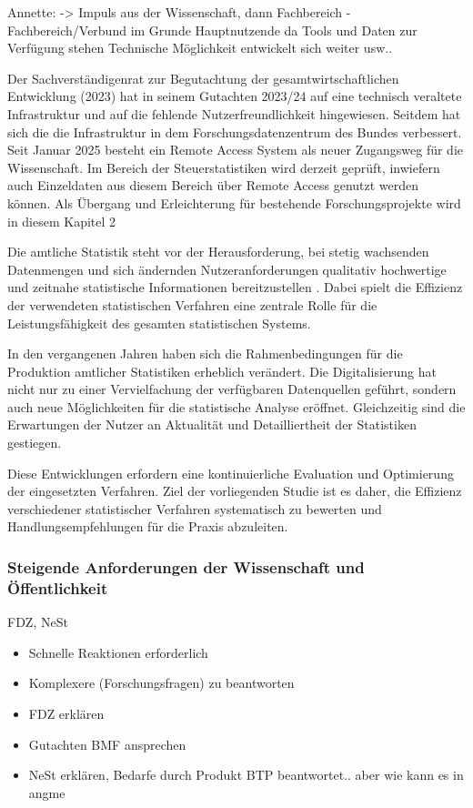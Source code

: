 \documentclass[
  german,
  10pt,
  twoside]{article}
\providecommand{\tightlist}{%
  \setlength{\itemsep}{0pt}\setlength{\parskip}{0pt}}
\begin{document}
Annette: -\textgreater{} Impuls aus der Wissenschaft, dann Fachbereich -
Fachbereich/Verbund im Grunde Hauptnutzende da Tools und Daten zur
Verfügung stehen Technische Möglichkeit entwickelt sich weiter usw..

Der Sachverständigenrat zur Begutachtung der gesamtwirtschaftlichen
Entwicklung (2023) hat in seinem Gutachten 2023/24 auf eine technisch
veraltete Infrastruktur und auf die fehlende Nutzerfreundlichkeit
hingewiesen. Seitdem hat sich die die Infrastruktur in dem
Forschungsdatenzentrum des Bundes verbessert. Seit Januar 2025 besteht
ein Remote Access System als neuer Zugangsweg für die Wissenschaft. Im
Bereich der Steuerstatistiken wird derzeit geprüft, inwiefern auch
Einzeldaten aus diesem Bereich über Remote Access genutzt werden können.
Als Übergang und Erleichterung für bestehende Forschungsprojekte wird in
diesem Kapitel 2

Die amtliche Statistik steht vor der Herausforderung, bei stetig
wachsenden Datenmengen und sich ändernden Nutzeranforderungen qualitativ
hochwertige und zeitnahe statistische Informationen bereitzustellen
\autocite{destatis2023}. Dabei spielt die Effizienz der verwendeten
statistischen Verfahren eine zentrale Rolle für die Leistungsfähigkeit
des gesamten statistischen Systems.

In den vergangenen Jahren haben sich die Rahmenbedingungen für die
Produktion amtlicher Statistiken erheblich verändert. Die
Digitalisierung hat nicht nur zu einer Vervielfachung der verfügbaren
Datenquellen geführt, sondern auch neue Möglichkeiten für die
statistische Analyse eröffnet. Gleichzeitig sind die Erwartungen der
Nutzer an Aktualität und Detailliertheit der Statistiken gestiegen.

Diese Entwicklungen erfordern eine kontinuierliche Evaluation und
Optimierung der eingesetzten Verfahren. Ziel der vorliegenden Studie ist
es daher, die Effizienz verschiedener statistischer Verfahren
systematisch zu bewerten und Handlungsempfehlungen für die Praxis
abzuleiten.

\subsubsection{Steigende Anforderungen der Wissenschaft und
Öffentlichkeit}\label{steigende-anforderungen-der-wissenschaft-und-uxf6ffentlichkeit}

FDZ, NeSt

\begin{itemize}
\tightlist
\item
  Schnelle Reaktionen erforderlich
\item
  Komplexere (Forschungsfragen) zu beantworten
\item
  FDZ erklären
\item
  Gutachten BMF ansprechen
\item
  NeSt erklären, Bedarfe durch Produkt BTP beantwortet.. aber wie kann
  es in angme
\end{itemize}
\end{document}
